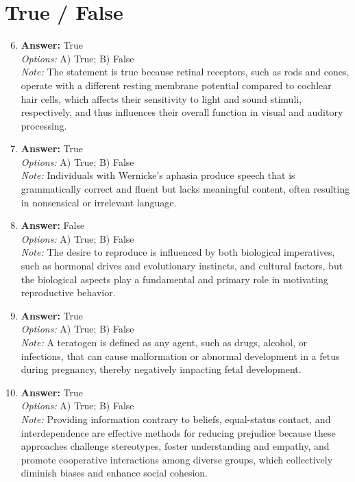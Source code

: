\documentclass[12pt]{article}
\begin{document}
\section*{True / False}
\begin{enumerate}[label=\arabic*.]
\setcounter{enumi}{5}
\item \textbf{Answer:} True
\\ \textit{Options:} A) True; B) False
\\ \textit{Note:} The statement is true because retinal receptors, such as rods and cones, operate with a different resting membrane potential compared to cochlear hair cells, which affects their sensitivity to light and sound stimuli, respectively, and thus influences their overall function in visual and auditory processing.
\item \textbf{Answer:} True
\\ \textit{Options:} A) True; B) False
\\ \textit{Note:} Individuals with Wernicke's aphasia produce speech that is grammatically correct and fluent but lacks meaningful content, often resulting in nonsensical or irrelevant language.
\item \textbf{Answer:} False
\\ \textit{Options:} A) True; B) False
\\ \textit{Note:} The desire to reproduce is influenced by both biological imperatives, such as hormonal drives and evolutionary instincts, and cultural factors, but the biological aspects play a fundamental and primary role in motivating reproductive behavior.
\item \textbf{Answer:} True
\\ \textit{Options:} A) True; B) False
\\ \textit{Note:} A teratogen is defined as any agent, such as drugs, alcohol, or infections, that can cause malformation or abnormal development in a fetus during pregnancy, thereby negatively impacting fetal development.
\item \textbf{Answer:} True
\\ \textit{Options:} A) True; B) False
\\ \textit{Note:} Providing information contrary to beliefs, equal-status contact, and interdependence are effective methods for reducing prejudice because these approaches challenge stereotypes, foster understanding and empathy, and promote cooperative interactions among diverse groups, which collectively diminish biases and enhance social cohesion.
\end{enumerate}
\end{document}
